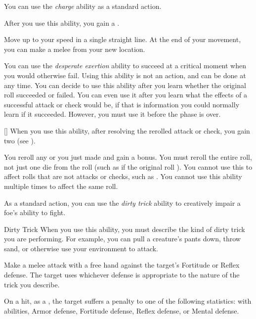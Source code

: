         You can use the \textit{charge} ability as a standard action.

        \begin{freeability}{}
            After you use this ability, you gain a .

            Move up to your speed in a single straight line.
            At the end of your movement, you can make a melee  from your new location.
        \end{freeability}

         You can use the \textit{desperate exertion} ability to succeed at a critical moment when you would otherwise fail.
        Using this ability is not an action, and can be done at any time.
        You can decide to use this ability after you learn whether the original roll succeeded or failed.
        You can even use it after you learn what the effects of a successful attack or check would be, if that is information you could normally learn if it succeeded.
        However, you must use it before the phase is over.

        \begin{freeability}{}[]
            When you use this ability, after resolving the rerolled attack or check, you gain two  (see ).

            You reroll any  or  you just made and gain a  bonus.
            You must reroll the entire roll, not just one die from the roll (such as if the original roll ).
            You cannot use this to affect rolls that are not attacks or checks, such as .
            You cannot use this ability multiple times to affect the same roll.
        \end{freeability}

         As a standard action, you can use the \textit{dirty trick} ability to creatively impair a foe's ability to fight.

        \begin{freeability}{Dirty Trick}\label{Dirty Trick}
            When you use this ability, you must describe the kind of dirty trick you are performing.
            For example, you can pull a creature's pants down, throw sand, or otherwise use your environment to attack.

            Make a melee attack with a free hand against the target's Fortitude or Reflex defense.
            The target uses whichever defense is appropriate to the nature of the trick you describe.

            On a hit, as a , the target suffers a  penalty to one of the following statistics:
             with  abilities, Armor defense, Fortitude defense, Reflex defense, or Mental defense.
        \end{freeability}

